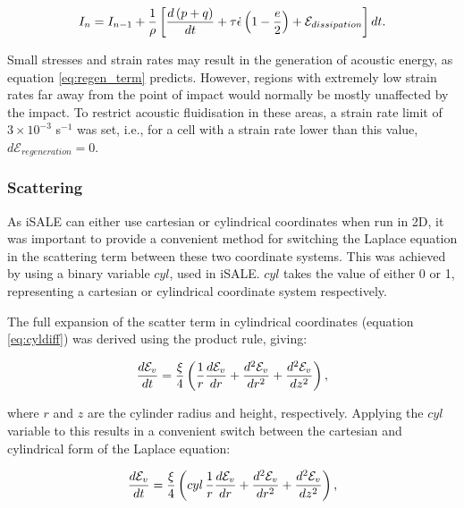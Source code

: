 \begin{equation}\label{eq:internalEnergydt}
I_{n} = I_{n-1} + \frac{1}{\rho}\left[\frac{d \left(p + q\right)}{d t} + \tau \dot{\epsilon}\left(1-\frac{e}{2}\right)+\mathcal{E}_{dissipation}\right] dt.\vspace{0.2cm}
\end{equation}
 
Small stresses and strain rates may result in the generation of acoustic energy, as equation \ref{eq:regen_term} predicts. However, regions with extremely low strain rates far away from the point of impact would normally be mostly unaffected by the impact. To restrict acoustic fluidisation in these areas, a strain rate limit of $3\times10^{-3}$ s$^{-1}$ was set, i.e., for a cell with a strain rate lower than this value, $d\mathcal{E}_{regeneration}=0$.

\subsubsection{Scattering \label{sec:scatter}}

As iSALE can either use cartesian or cylindrical coordinates when run in 2D, it was important to provide a convenient method for switching the Laplace equation in the scattering term between these two coordinate systems. This was achieved by using a binary variable $cyl$, used in iSALE. $cyl$ takes the value of either 0 or 1, representing a cartesian or cylindrical coordinate system respectively.

The full expansion of the scatter term in cylindrical coordinates (equation \ref{eq:cyldiff}) was derived using the product rule, giving:

\begin{equation}\label{eq:scatter_expand}
\frac{d \mathcal{E}_{v} }{d t} = \frac{\xi}{4} \left(\frac{1}{r} \frac{d \mathcal{E}_{v}}{dr} + \frac{d^{2} \mathcal{E}_{v}}{dr^{2}} + \frac{d^{2} \mathcal{E}_{v}}{dz^{2}} \right),\vspace{0.2cm}
\end{equation}

where $r$ and $z$ are the cylinder radius and height, respectively. Applying the $cyl$ variable to this results in a convenient switch between the cartesian and cylindrical form of the Laplace equation:

\begin{equation}
\frac{d \mathcal{E}_{v} }{d t} = \frac{\xi}{4} \left(cyl\,\frac{1}{r} \frac{d \mathcal{E}_{v}}{dr} + \frac{d^{2} \mathcal{E}_{v}}{dr^{2}} + \frac{d^{2} \mathcal{E}_{v}}{dz^{2}} \right),\vspace{0.2cm}
\end{equation}

